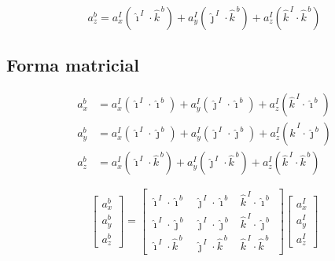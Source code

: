 \documentclass[11pt,a4paper]{article}
\begin{document}
\begin{equation}
  \boxed{\;a_z^{b} = a_x^{I}\left(\hat{\imath}^{\,I}\cdot\hat{k}^{\,b}\right)
  + a_y^{I}\left(\hat{\jmath}^{\,I}\cdot\hat{k}^{\,b}\right)
  + a_z^{I}\left(\hat{k}^{\,I}\cdot\hat{k}^{\,b}\right)\;}
\end{equation}

\subsection*{Forma matricial}

\begin{align}
  a_x^{b} &= a_x^{I}\left(\hat{\imath}^{\,I}\cdot\hat{\imath}^{\,b}\right)
           + a_y^{I}\left(\hat{\jmath}^{\,I}\cdot\hat{\imath}^{\,b}\right)
           + a_z^{I}\left(\hat{k}^{\,I}\cdot\hat{\imath}^{\,b}\right) \\
  a_y^{b} &= a_x^{I}\left(\hat{\imath}^{\,I}\cdot\hat{\jmath}^{\,b}\right)
           + a_y^{I}\left(\hat{\jmath}^{\,I}\cdot\hat{\jmath}^{\,b}\right)
           + a_z^{I}\left(\hat{k}^{\,I}\cdot\hat{\jmath}^{\,b}\right) \\
  a_z^{b} &= a_x^{I}\left(\hat{\imath}^{\,I}\cdot\hat{k}^{\,b}\right)
           + a_y^{I}\left(\hat{\jmath}^{\,I}\cdot\hat{k}^{\,b}\right)
           + a_z^{I}\left(\hat{k}^{\,I}\cdot\hat{k}^{\,b}\right)
\end{align}

\begin{equation}
  \begin{bmatrix} a_x^{b} \\[4pt] a_y^{b} \\[4pt] a_z^{b} \end{bmatrix}
  =
  \begin{bmatrix}
    \hat{\imath}^{\,I}\cdot\hat{\imath}^{\,b} & \hat{\jmath}^{\,I}\cdot\hat{\imath}^{\,b} & \hat{k}^{\,I}\cdot\hat{\imath}^{\,b} \\[5pt]
    \hat{\imath}^{\,I}\cdot\hat{\jmath}^{\,b} & \hat{\jmath}^{\,I}\cdot\hat{\jmath}^{\,b} & \hat{k}^{\,I}\cdot\hat{\jmath}^{\,b} \\[5pt]
    \hat{\imath}^{\,I}\cdot\hat{k}^{\,b}      & \hat{\jmath}^{\,I}\cdot\hat{k}^{\,b}      & \hat{k}^{\,I}\cdot\hat{k}^{\,b}
  \end{bmatrix}
  \begin{bmatrix} a_x^{I} \\[4pt] a_y^{I} \\[4pt] a_z^{I} \end{bmatrix}
\end{equation}
\end{document}
